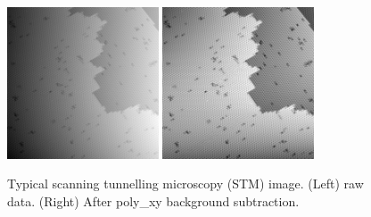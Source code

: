 \documentclass[11pt]{article}
\begin{document}
\begin{figure}[H]
\centering
\includegraphics[width=0.4\textwidth]{figs/default_2011Jan07-144939_STM-STM_Spectroscopy--1_1_BD_none}
\hspace{1em}\includegraphics[width=0.4\textwidth]{figs/default_2011Jan07-144939_STM-STM_Spectroscopy--1_1_BD_poly_xy}
\caption{Typical scanning tunnelling microscopy (STM) image. (Left) raw data. (Right) After poly\_xy background subtraction.}
\label{fig:stm}
\end{figure}
\end{document}
